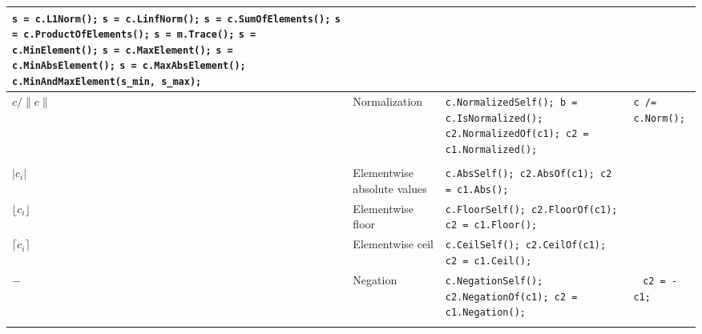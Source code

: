 \documentclass[letterpaper,10pt]{article}
\newcommand{\doublehlinefour}{\hline & & & \\ [-10pt] \hline}
\begin{document}
\begin{center}
\begin{tabular}{|p{0.6in}|p{1.9in}|p{3.1in}|p{1.3in}|}
          \texttt{s = c.L1Norm();} \newline
          \texttt{s = c.LinfNorm();} \newline
          \texttt{s = c.SumOfElements();} \newline
          \texttt{s = c.ProductOfElements();} \newline
          \texttt{s = m.Trace();} \newline
          \texttt{s = c.MinElement();} \newline
          \texttt{s = c.MaxElement();} \newline
          \texttt{s = c.MinAbsElement();} \newline
          \texttt{s = c.MaxAbsElement();} \newline
          \texttt{c.MinAndMaxElement(s\_min, s\_max);}
          &
          \\
          \hline
          
          $c/\|c\|$
          &
          Normalization
          &
          \texttt{c.NormalizedSelf(); b = c.IsNormalized();} \newline
          \texttt{c2.NormalizedOf(c1); c2 = c1.Normalized();}
          &
          \texttt{c /= c.Norm();}
          \\
          \doublehlinefour

          $|c_i|$
          &
          Elementwise absolute values
          &
          \texttt{c.AbsSelf(); c2.AbsOf(c1); c2 = c1.Abs();}
          &
          \\
          \hline

          $\lfloor c_i \rfloor$
          &
          Elementwise floor
          &
          \texttt{c.FloorSelf(); c2.FloorOf(c1); c2 = c1.Floor();}
          &
          \\
          \hline

          $\lceil c_i \rceil$
          &
          Elementwise ceil
          &
          \texttt{c.CeilSelf(); c2.CeilOf(c1); c2 = c1.Ceil();}
          &
          \\
          \hline

          $-$
          &
          Negation
          &
          \texttt{c.NegationSelf();} \newline
          \texttt{c2.NegationOf(c1); c2 = c1.Negation();}
          &
          \ \newline
          \texttt{c2 = -c1;}
          \\
          \doublehlinefour


\end{tabular}
\end{center}
\end{document}

